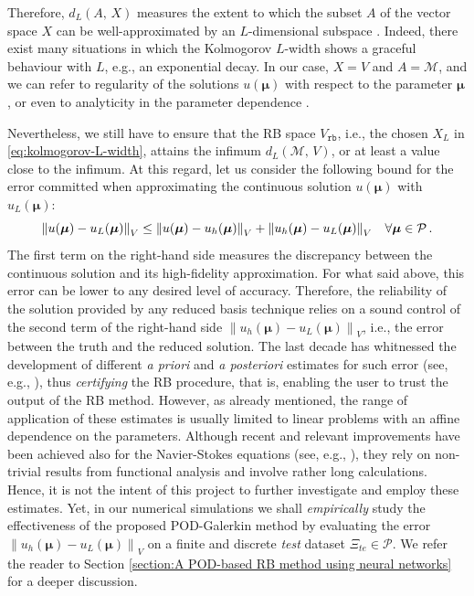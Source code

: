 \documentclass[12pt, a4paper, twoside, openright, notitlepage]{report}
\numberwithin{equation}{chapter}
\theoremstyle{theorem}
\theoremstyle{definition}
\theoremstyle{remark}
\theoremstyle{proposition}
\numberwithin{figure}{chapter}
\newcommand{\norm}[1]{\left\lVert#1\right\rVert}
\newcommand{\bg}[1]{\boldsymbol{#1}}
\begin{document}
		\noindent Therefore, $d_L(A, \, X)$ measures the extent to which the subset $A$ of the vector space $X$ can be well-approximated by an $L$-dimensional subspace \cite{Mad06}. Indeed, there exist many situations in which the Kolmogorov $L$-width shows a graceful behaviour with $L$, e.g., an exponential decay. In our case, $X = V$ and $A = \mathcal{M}$, and we can refer to regularity of the solutions $u(\bg{\mu})$ with respect to the parameter $\bg{\mu}$, or even to analyticity in the parameter dependence \cite{Buf12}.
		
		Nevertheless, we still have to ensure that the RB space $V_{\texttt{rb}}$, i.e., the chosen $X_L$ in \eqref{eq:kolmogorov-L-width}, attains the infimum $d_L(\mathcal{M}, \, V)$, or at least a value close to the infimum. At this regard, let us consider the following bound for the error committed when approximating the continuous solution $u(\bg{\mu})$ with $u_L(\bg{\mu})$:
		\begin{equation*}
			\norm{u(\bg{\mu}) - u_L(\bg{\mu})}_V \leq \norm{u(\bg{\mu}) - u_h(\bg{\mu})}_V + \norm{u_h(\bg{\mu}) - u_L(\bg{\mu})}_V \hspace*{0.3cm} \forall \bg{\mu} \in \mathcal{P} \, .
		\end{equation*}
		The first term on the right-hand side measures the discrepancy between the continuous solution and its high-fidelity approximation. For what said above, this error can be lower to any desired level of accuracy. Therefore, the reliability of the solution provided by any reduced basis technique relies on a sound control of the second term of the right-hand side $\norm{u_h(\bg{\mu}) - u_L(\bg{\mu})}_V$, i.e., the error between the truth and the reduced solution. The last decade has whitnessed the development of different \emph{a priori} and \emph{a posteriori} estimates for such error (see, e.g., \cite{Buf12, HSR16, Mad06}), thus \emph{certifying} the RB procedure, that is, enabling the user to trust the output of the RB method. However, as already mentioned, the range of application of these estimates is usually limited to linear problems with an affine dependence on the parameters. Although recent and relevant improvements have been achieved also for the Navier-Stokes equations (see, e.g., \cite{Dep08, QMN15}), they rely on non-trivial results from functional analysis and involve rather long calculations. Hence, it is not the intent of this project to further investigate and employ these estimates. Yet, in our numerical simulations we shall \emph{empirically} study the effectiveness of the proposed POD-Galerkin method by evaluating the error $\norm{u_h(\bg{\mu}) - u_L(\bg{\mu})}_V$ on a finite and discrete \emph{test} dataset $\Xi_{te} \in \mathcal{P}$. We refer the reader to Section \ref{section:A POD-based RB method using neural networks} for a deeper discussion.
		
\end{document}
